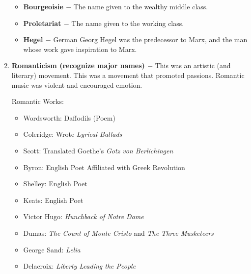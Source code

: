 \documentclass[12pt]{article}
\begin{document}
\begin{enumerate}
\begin{itemize}

\item \textbf{Bourgeoisie $-$} The name given to the wealthy middle class.

\item \textbf{Proletariat $-$} The name given to the working class.

\item \textbf{Hegel $-$} German Georg Hegel was the predecessor to Marx, and the man whose work gave inspiration to Marx.

\end{itemize}

\item \textbf{Romanticism (recognize major names) $-$} This was an artistic (and literary) movement. This was a movement that promoted passions. Romantic music was violent and encouraged emotion. 

\begin{center}

Romantic Works:

\end{center}

\begin{itemize}

\item Wordsworth: Daffodils (Poem)

\item Coleridge: Wrote \textit{Lyrical Ballads}

\item Scott: Translated Goethe's \textit{Gotz von Berlichingen}

\item Byron: English Poet Affiliated with Greek Revolution

\item Shelley: English Poet

\item Keats: English Poet

\item Victor Hugo: \textit{Hunchback of Notre Dame}

\item Dumas: \textit{The Count of Monte Cristo} and \textit{The Three Musketeers}

\item George Sand: \textit{Lelia}

\item Delacroix: \textit{Liberty Leading the People}


\end{itemize}
\end{enumerate}
\end{document}
